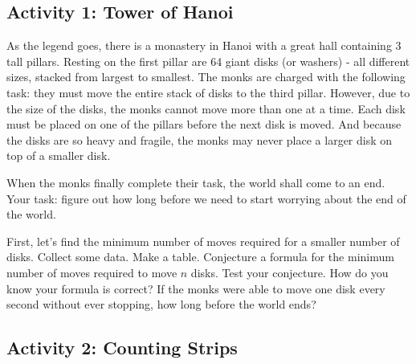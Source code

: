 \documentclass[11pt]{exam}
\begin{document}

\subsection*{Activity 1: Tower of Hanoi}

As the legend goes, there is a monastery in Hanoi with a great hall containing 3 tall pillars.  Resting on the first pillar are 64 giant disks (or washers) - all different sizes, stacked from largest to smallest.  The monks are charged with the following task: they must move the entire stack of disks to the third pillar.  However, due to the size of the disks, the monks cannot move more than one at a time.  Each disk must be placed on one of the pillars before the next disk is moved.  And because the disks are so heavy and fragile, the monks may never place a larger disk on top of a smaller disk.

When the monks finally complete their task, the world shall come to an end.  Your task: figure out how long before we need to start worrying about the end of the world.

\begin{questions}
  \question First, let's find the minimum number of moves required for a smaller number of disks.  Collect some data. Make a table.
  \vfill
  \question Conjecture a formula for the minimum number of moves required to move $n$ disks.  Test your conjecture.  How do you know your formula is correct?
  \vfill
  \question If the monks were able to move one disk every second without ever stopping, how long before the world ends?
  
  \vfill
  
\end{questions}


\newpage

\subsection*{Activity 2: Counting Strips}
\end{document}
